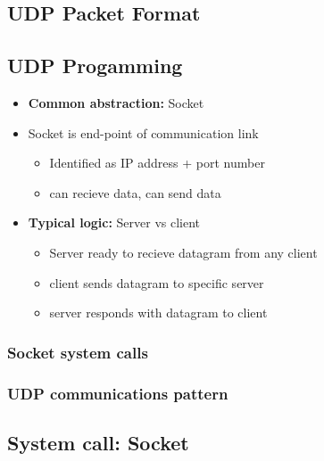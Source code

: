 \documentclass{report}
\begin{document}
    \bigbreak \noindent 
    \subsection{UDP Packet Format}
    \bigbreak \noindent 

    \bigbreak \noindent 
    \subsection{UDP Progamming}
    \bigbreak \noindent 
    \begin{itemize}
        \item \textbf{Common abstraction:} Socket 
        \item Socket is end-point of communication link
            \begin{itemize}
                \item Identified as IP address + port number
                \item can recieve data, can send data
            \end{itemize}
        \item \textbf{Typical logic:} Server vs client
            \begin{itemize}
                \item Server ready to recieve datagram from any client 
                \item client sends datagram to specific server
                \item server responds with datagram to client
            \end{itemize}
    \end{itemize}

    \bigbreak \noindent 
    \subsubsection{Socket system calls}
    \bigbreak \noindent 

    \bigbreak \noindent 
    \subsubsection{UDP communications pattern}
    \bigbreak \noindent 

    \bigbreak \noindent 
    \subsection{System call: Socket}
    \bigbreak \noindent 
\end{document}

